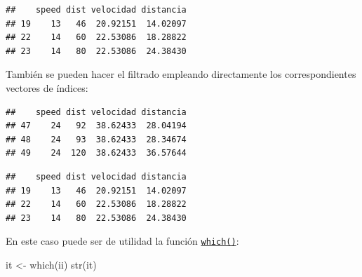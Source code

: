 \documentclass[
]{book}
\newenvironment{Shaded}{\begin{snugshade}}{\end{snugshade}}
\newcommand{\CommentTok}[1]{\textcolor[rgb]{0.56,0.35,0.01}{\textit{#1}}}
\newcommand{\DecValTok}[1]{\textcolor[rgb]{0.00,0.00,0.81}{#1}}
\newcommand{\FunctionTok}[1]{\textcolor[rgb]{0.00,0.00,0.00}{#1}}
\newcommand{\NormalTok}[1]{#1}
\newcommand{\OtherTok}[1]{\textcolor[rgb]{0.56,0.35,0.01}{#1}}
\newcommand{\SpecialCharTok}[1]{\textcolor[rgb]{0.00,0.00,0.00}{#1}}
\theoremstyle{break}
\theoremstyle{nonumberplain}
\begin{document}
\begin{verbatim}
##    speed dist velocidad distancia
## 19    13   46  20.92151  14.02097
## 22    14   60  22.53086  18.28822
## 23    14   80  22.53086  24.38430
\end{verbatim}

También se pueden hacer el filtrado empleando directamente los
correspondientes vectores de índices:

\begin{Shaded}
\end{Shaded}

\begin{verbatim}
##    speed dist velocidad distancia
## 47    24   92  38.62433  28.04194
## 48    24   93  38.62433  28.34674
## 49    24  120  38.62433  36.57644
\end{verbatim}

\begin{Shaded}
\end{Shaded}

\begin{verbatim}
##    speed dist velocidad distancia
## 19    13   46  20.92151  14.02097
## 22    14   60  22.53086  18.28822
## 23    14   80  22.53086  24.38430
\end{verbatim}

En este caso puede ser de utilidad la función \href{https://www.rdocumentation.org/packages/base/versions/3.6.1/topics/which}{\texttt{which()}}:

\begin{Shaded}
\begin{Highlighting}[]
\NormalTok{it }\OtherTok{\textless{}{-}} \FunctionTok{which}\NormalTok{(ii)}
\FunctionTok{str}\NormalTok{(it)}
\end{Highlighting}
\end{Shaded}
\end{document}
